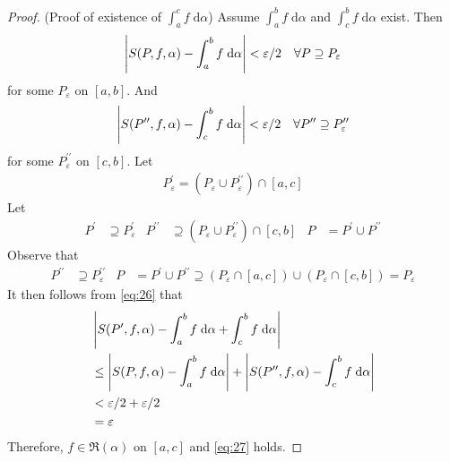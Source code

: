 \documentclass[thmcnt=section, 12pt]{my-elegantbook}
\begin{document}
\begin{proof}
    \par (Proof of existence of $\int_a^c f \; \mathrm{d}\alpha$) Assume $\int_a^b f \; \mathrm{d}\alpha$ and $\int_c^b f \; \mathrm{d}\alpha$ exist. Then
    \begin{align*}
        \left\lvert S(P, f, \alpha) - \int_a^b f \; \mathrm{d}\alpha \right\rvert < \varepsilon / 2
        \quad \forall P \supseteq P_\varepsilon
    \end{align*}
    for some $P_\varepsilon$ on $[a, b]$. And
    \begin{align*}
        \left\lvert S(P^{\prime\prime}, f, \alpha) - \int_c^b f \; \mathrm{d}\alpha \right\rvert < \varepsilon / 2
        \quad \forall P^{\prime\prime} \supseteq P_\varepsilon^{\prime\prime}
    \end{align*}
    for some $P_\varepsilon^{\prime\prime}$ on $[c, b]$.
    Let
    \begin{align*}
        P_\varepsilon^\prime = (P_\varepsilon \cup P_\varepsilon^{\prime\prime}) \cap [a, c]
    \end{align*}
    Let
    \begin{align*}
        P^\prime         & \supseteq P_\varepsilon^\prime                                          &
        P^{\prime\prime} & \supseteq (P_\varepsilon \cup P_\varepsilon^{\prime\prime}) \cap [c, b] &
        P                & = P^\prime \cup P^{\prime\prime}
    \end{align*}
    Observe that
    \begin{align*}
        P^{\prime\prime} & \supseteq P_\varepsilon^{\prime\prime} &
        P                & = P^\prime \cup P^{\prime\prime}
        \supseteq (P_\varepsilon \cap [a, c]) \cup (P_\varepsilon \cap [c, b])
        = P_\varepsilon
    \end{align*}
    It then follows from \eqref{eq:26} that
    \begin{align*}
         & \left\lvert 
            S(P^\prime, f, \alpha)
            - \int_a^b f \; \mathrm{d}\alpha
            + \int_c^b f \; \mathrm{d}\alpha
         \right\rvert                                      \\
         & \leq \left\lvert 
            S(P, f, \alpha)
            - \int_a^b f \; \mathrm{d}\alpha
         \right\rvert + \left\lvert 
            S(P^{\prime\prime}, f, \alpha)
            - \int_c^b f \; \mathrm{d}\alpha
         \right\rvert                                      \\
         & < \varepsilon / 2 + \varepsilon / 2 \\
         & = \varepsilon
    \end{align*}
    Therefore, $f \in \mathfrak{R}(\alpha)$ on $[a, c]$ and \eqref{eq:27} holds.

\end{proof}
\end{document}
